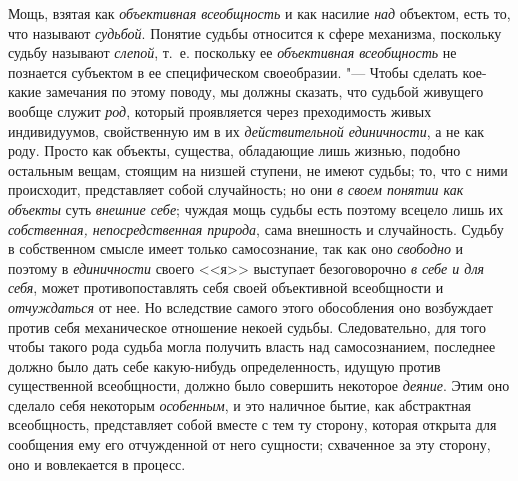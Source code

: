 Мощь, взятая как
{\em объективная всеобщность}
и как насилие {\em над}
объектом, есть то, что называют
{\em судьбой}. Понятие
судьбы относится к сфере механизма, поскольку судьбу называют
{\em слепой}, т.~е.
поскольку ее {\em объективная
всеобщность} не познается субъектом в ее специфическом
своеобразии. "--- Чтобы сделать кое-какие замечания
по этому поводу, мы должны сказать, что судьбой живущего вообще служит
{\em род}, который
проявляется через преходимость живых индивидуумов, свойственную им в их
{\em действительной единичности},
а не как роду. Просто как объекты, существа, обладающие лишь
жизнью, подобно остальным вещам, стоящим на низшей ступени, не имеют
судьбы; то, что с ними происходит, представляет собой случайность; но они
{\em в своем понятии как объекты}
суть {\em внешние себе};
чуждая мощь судьбы есть поэтому всецело лишь их
{\em собственная, непосредственная
природа}, сама внешность и случайность. Судьбу в собственном
смысле имеет только самосознание, так как оно
{\em свободно} и поэтому
в {\em единичности}
своего <<я>> выступает безоговорочно
{\em в себе и для себя},
может противопоставлять себя своей объективной всеобщности и
{\em отчуждаться} от нее.
Но вследствие самого этого обособления оно возбуждает против
себя механическое отношение некоей судьбы. Следовательно, для того чтобы
такого рода судьба могла получить власть над самосознанием, последнее
должно было дать себе какую-нибудь определенность, идущую против
существенной всеобщности, должно было совершить некоторое
{\em деяние}. Этим оно
сделало себя некоторым {\em особенным},
и это наличное бытие, как абстрактная всеобщность,
представляет собой вместе с тем ту сторону, которая открыта для сообщения
ему его отчужденной от него сущности; схваченное за эту сторону, оно и
вовлекается в
процесс.
